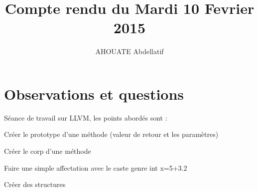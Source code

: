 \documentclass{../../../../../res/rapport}
\author{AHOUATE Abdellatif}
\title{Compte rendu du Mardi 10 Fevrier 2015}
\begin{document}
    \maketitle
    \tableofcontents
    \clearpage
    
    \section{Observations et questions} 
    \label{sec:observations_et_questions}
	Séance de travail sur LLVM, les points abordés sont :
            \item Créer le prototype d'une méthode (valeur de retour et les paramètres)
			\item Créer le corp d'une méthode
			\item Faire une simple affectation avec le caste genre int x=5+3.2
			\item Créer des structures 		
\end{document}
